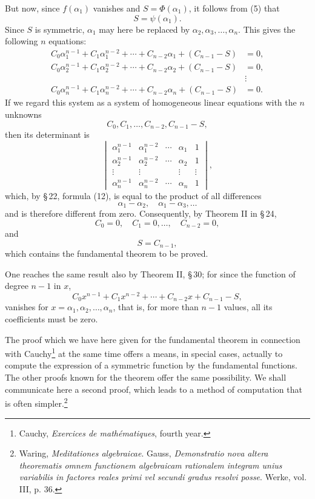 \documentclass[11pt]{article}
\begin{document}
But now, since \(f(\alpha_1)\) vanishes and \(S=\Phi(\alpha_1)\), it follows from (5) that
\begin{equation}
 S=\psi(\alpha_1).
\tag{7}
\end{equation}
Since \(S\) is symmetric, \(\alpha_1\) may here be replaced by \(\alpha_2,\alpha_3,\ldots,\alpha_n\). This gives the following \(n\) equations:
\[
\begin{aligned}
 C_0\alpha_1^{n-1}+C_1\alpha_1^{n-2}+\cdots+C_{n-2}\alpha_1+(C_{n-1}-S)&=0,\\
 C_0\alpha_2^{n-1}+C_1\alpha_2^{n-2}+\cdots+C_{n-2}\alpha_2+(C_{n-1}-S)&=0,\\
 &\vdots\\
 C_0\alpha_n^{n-1}+C_1\alpha_n^{n-2}+\cdots+C_{n-2}\alpha_n+(C_{n-1}-S)&=0.
\end{aligned}
\tag{8}
\]
If we regard this system as a system of homogeneous linear equations with the \(n\) unknowns
\[
 C_0,C_1,\ldots,C_{n-2},C_{n-1}-S,
\]
then its determinant is
\[
\begin{vmatrix}
 \alpha_1^{n-1}&\alpha_1^{n-2}&\cdots&\alpha_1&1\\
 \alpha_2^{n-1}&\alpha_2^{n-2}&\cdots&\alpha_2&1\\
 \vdots&\vdots&&\vdots&\vdots\\
 \alpha_n^{n-1}&\alpha_n^{n-2}&\cdots&\alpha_n&1
\end{vmatrix},
\]
which, by \S\,22, formula (12), is equal to the product of all differences
\[
 \alpha_1-\alpha_2,\quad \alpha_1-\alpha_3,\ldots
\]
and is therefore different from zero. Consequently, by Theorem II in \S\,24,
\[
 C_0=0,\quad C_1=0,\ldots,\quad C_{n-2}=0,
\]
and
\begin{equation}
 S=C_{n-1},
\tag{9}
\end{equation}
which contains the fundamental theorem to be proved.

One reaches the same result also by Theorem II, \S\,30; for since the function of degree \(n-1\) in \(x\),
\[
 C_0x^{n-1}+C_1x^{n-2}+\cdots+C_{n-2}x+C_{n-1}-S,
\]
vanishes for \(x=\alpha_1,\alpha_2,\ldots,\alpha_n\), that is, for more than \(n-1\) values, all its coefficients must be zero.

The proof which we have here given for the fundamental theorem in connection with Cauchy\footnote{Cauchy, \emph{Exercices de mathématiques}, fourth year.} at the same time offers a means, in special cases, actually to compute the expression of a symmetric function by the fundamental functions. The other proofs known for the theorem offer the same possibility. We shall communicate here a second proof, which leads to a method of computation that is often simpler.\footnote{Waring, \emph{Meditationes algebraicae}. Gauss, \emph{Demonstratio nova altera theorematis omnem functionem algebraicam rationalem integram unius variabilis in factores reales primi vel secundi gradus resolvi posse}. Werke, vol. III, p. 36.}
\end{document}
